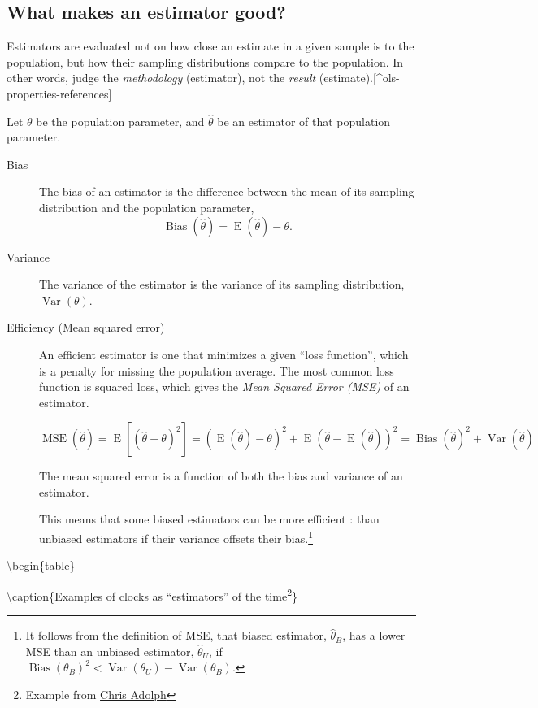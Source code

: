 \documentclass[]{book}
\let\rmarkdownfootnote\footnote%
\def\footnote{\protect\rmarkdownfootnote}
\DeclareMathOperator{\E}{E}
\DeclareMathOperator{\Var}{Var}
\DeclareMathOperator{\Bias}{Bias}
\DeclareMathOperator{\MSE}{MSE}
\begin{document}
\subsection{What makes an estimator
good?}\label{what-makes-an-estimator-good}

Estimators are evaluated not on how close an estimate in a given sample
is to the population, but how their sampling distributions compare to
the population. In other words, judge the \emph{methodology}
(estimator), not the \emph{result}
(estimate).{[}\^{}ols-properties-references{]}

Let \(\theta\) be the population parameter, and \(\hat\theta\) be an
estimator of that population parameter.

\begin{description}
\item[Bias]
The bias of an estimator is the difference between the mean of its
sampling distribution and the population parameter,
\[\Bias(\hat\theta) = \E(\hat\theta) - \theta .\]
\item[Variance]
The variance of the estimator is the variance of its sampling
distribution, \(\Var(\theta)\).
\item[Efficiency (Mean squared error)]
An efficient estimator is one that minimizes a given ``loss function'',
which is a penalty for missing the population average. The most common
loss function is squared loss, which gives the \emph{Mean Squared Error
(MSE)} of an estimator.

\[\MSE(\hat\theta) = \E\left[{(\hat\theta - \theta)}^{2}\right] =  (\E(\hat\theta) - \theta)^2 + \E(\hat\theta - \E(\hat\theta))^2 = \Bias(\hat\theta)^2 + \Var(\hat\theta)\]

The mean squared error is a function of both the bias and variance of an
estimator.

This means that some biased estimators can be more efficient : than
unbiased estimators if their variance offsets their bias.\footnote{It
  follows from the definition of MSE, that biased estimator,
  \(\hat\theta_{B}\), has a lower MSE than an unbiased estimator,
  \(\hat\theta_{U}\), if
  \(\Bias(\theta_B)^2 < \Var(\theta_U) - \Var(\theta_B)\).}
\end{description}

\textbackslash{}begin\{table\}

\textbackslash{}caption\{\label{tab:unnamed-chunk-1}Examples of clocks as
``estimators'' of the time\footnote{Example from
  \href{http://faculty.washington.edu/cadolph/503/topic3.pw.pdf}{Chris
  Adolph}}\} \centering
\end{document}
